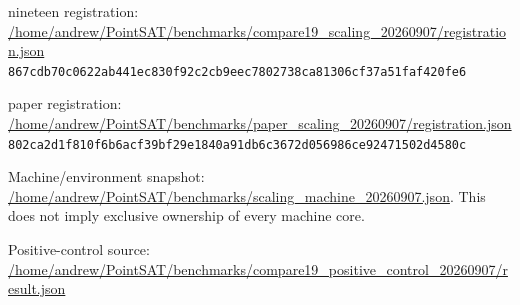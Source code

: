 \documentclass[10pt,a4paper]{article}
\begin{document}
nineteen registration: \url{/home/andrew/PointSAT/benchmarks/compare19_scaling_20260907/registration.json}\\{\footnotesize\texttt{867cdb70c0622ab441ec830f92c2cb9eec7802738ca81306cf37a51faf420fe6}}

paper registration: \url{/home/andrew/PointSAT/benchmarks/paper_scaling_20260907/registration.json}\\{\footnotesize\texttt{802ca2d1f810f6b6acf39bf29e1840a91db6c3672d056986ce92471502d4580c}}

Machine/environment snapshot: {\small\url{/home/andrew/PointSAT/benchmarks/scaling_machine_20260907.json}}. This does not imply exclusive ownership of every machine core.

Positive-control source: {\small\url{/home/andrew/PointSAT/benchmarks/compare19_positive_control_20260907/result.json}}
\end{document}
